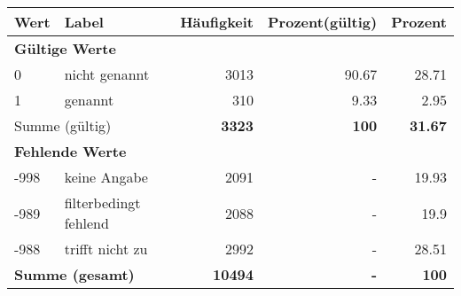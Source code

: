      \begin{longtable}{lXrrr}
     \toprule
     \textbf{Wert} & \textbf{Label} & \textbf{Häufigkeit} & \textbf{Prozent(gültig)} & \textbf{Prozent} \\
     \endhead
     \midrule
     \multicolumn{5}{l}{\textbf{Gültige Werte}}\\

     0 &
     \multicolumn{1}{X}{ nicht genannt   } &


       \num{3013} &
       \num[round-mode=places,round-precision=2]{90,67} &
         \num[round-mode=places,round-precision=2]{28,71} \\

     1 &
     \multicolumn{1}{X}{ genannt   } &


       \num{310} &
       \num[round-mode=places,round-precision=2]{9,33} &
         \num[round-mode=places,round-precision=2]{2,95} \\
     \midrule
     \multicolumn{2}{l}{Summe (gültig)} &
       \textbf{\num{3323}} &
     \textbf{100} &
       \textbf{\num[round-mode=places,round-precision=2]{31,67}} \\
     \multicolumn{5}{l}{\textbf{Fehlende Werte}}\\
       -998 &
       keine Angabe &
         \num{2091} &
        - &
         \num[round-mode=places,round-precision=2]{19,93} \\
       -989 &
       filterbedingt fehlend &
         \num{2088} &
        - &
         \num[round-mode=places,round-precision=2]{19,9} \\
       -988 &
       trifft nicht zu &
         \num{2992} &
        - &
         \num[round-mode=places,round-precision=2]{28,51} \\
     \midrule
     \multicolumn{2}{l}{\textbf{Summe (gesamt)}} &
          \textbf{\num{10494}} &
        \textbf{-} &
        \textbf{100} \\
     \bottomrule
     \end{longtable}
     
